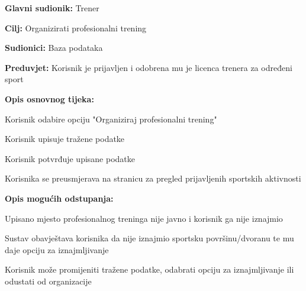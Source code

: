 					\noindent {}
					\begin{packed_item}
						
						\item \textbf{Glavni sudionik: }Trener
						\item  \textbf{Cilj:} Organizirati profesionalni trening
						\item  \textbf{Sudionici:} Baza podataka
						\item  \textbf{Preduvjet:} Korisnik je prijavljen i odobrena mu je licenca trenera za određeni sport
						\item  \textbf{Opis osnovnog tijeka:}
						
						\item[] \begin{packed_enum}
							
							\item Korisnik odabire opciju "Organiziraj profesionalni trening"
							\item Korisnik upisuje tražene podatke
							\item Korisnik potvrđuje upisane podatke
							\item Korisnika se preusmjerava na stranicu za pregled prijavljenih sportskih aktivnosti
							
						\end{packed_enum}
						
						\item  \textbf{Opis mogućih odstupanja:}
						
						\item[] \begin{packed_item}
							
							\item[2.a] Upisano mjesto profesionalnog treninga nije javno i korisnik ga nije iznajmio
							\item[] \begin{packed_enum}
								
								\item Sustav obavještava korisnika da nije iznajmio sportsku površinu/dvoranu te mu daje opciju za iznajmljivanje
								\item Korisnik može promijeniti tražene podatke, odabrati opciju za iznajmljivanje ili odustati od organizacije
								
							\end{packed_enum}
							
						\end{packed_item}
					\end{packed_item}
					
